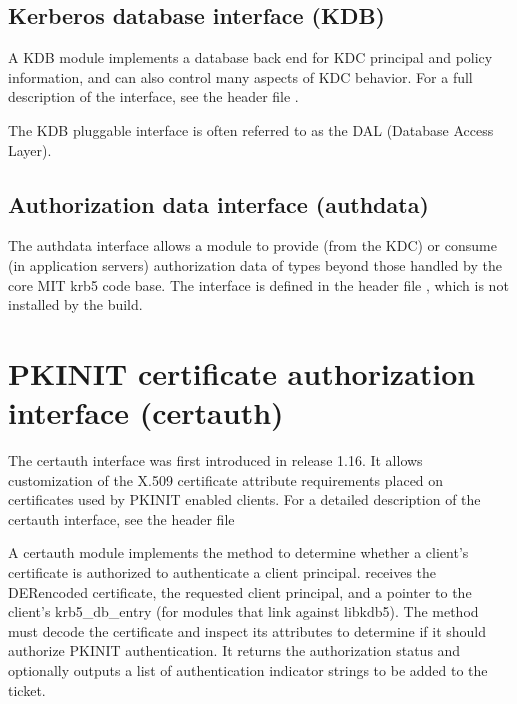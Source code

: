 \documentclass[letterpaper,10pt,english]{sphinxmanual}
\begin{document}
\subsection{Kerberos database interface (KDB)}
\label{\detokenize{plugindev/internal:kerberos-database-interface-kdb}}
\sphinxAtStartPar
A KDB module implements a database back end for KDC principal and
policy information, and can also control many aspects of KDC behavior.
For a full description of the interface, see the header file
.

\sphinxAtStartPar
The KDB pluggable interface is often referred to as the DAL (Database
Access Layer).


\subsection{Authorization data interface (authdata)}
\label{\detokenize{plugindev/internal:authorization-data-interface-authdata}}
\sphinxAtStartPar
The authdata interface allows a module to provide (from the KDC) or
consume (in application servers) authorization data of types beyond
those handled by the core MIT krb5 code base.  The interface is
defined in the header file , which is not
installed by the build.

\sphinxstepscope


\section{PKINIT certificate authorization interface (certauth)}
\label{\detokenize{plugindev/certauth:pkinit-certificate-authorization-interface-certauth}}\label{\detokenize{plugindev/certauth:certauth-plugin}}\label{\detokenize{plugindev/certauth::doc}}
\sphinxAtStartPar
The certauth interface was first introduced in release 1.16.  It
allows customization of the X.509 certificate attribute requirements
placed on certificates used by PKINIT enabled clients.  For a detailed
description of the certauth interface, see the header file

\sphinxAtStartPar
A certauth module implements the  method to determine
whether a client’s certificate is authorized to authenticate a client
principal.   receives the DER\sphinxhyphen{}encoded certificate, the
requested client principal, and a pointer to the client’s
krb5\_db\_entry (for modules that link against libkdb5).  The method
must decode the certificate and inspect its attributes to determine if
it should authorize PKINIT authentication.  It returns the
authorization status and optionally outputs a list of authentication
indicator strings to be added to the ticket.
\end{document}

